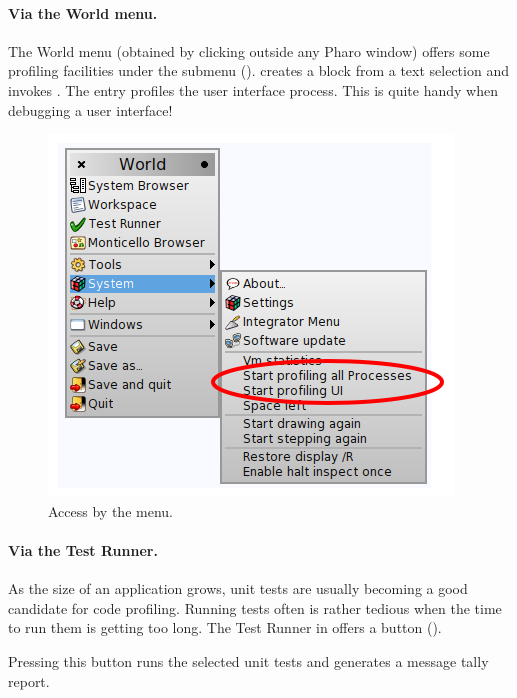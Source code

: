 \documentclass[a4paper,10pt,twoside]{book}
\begin{document}
\paragraph{Via the World menu.}
The World menu (obtained by clicking outside any Pharo window) offers some profiling facilities under the  submenu ().  creates a block from a text selection and invokes . The entry  profiles the user interface process. This is quite handy when debugging a user interface!

\begin{figure}[h]
	\begin{center}
	\includegraphics[width=.6\linewidth]{menu}
	\caption{Access by the menu.}
	\end{center}
\end{figure}



\paragraph{Via the Test Runner.}
As the size of an application grows, unit tests are usually becoming a good candidate for code profiling. Running tests often is rather tedious when the time to run them is getting too long. The Test Runner in \pharo offers a button  (). 

Pressing this button runs the selected unit tests and generates a message tally report. 
\end{document}
